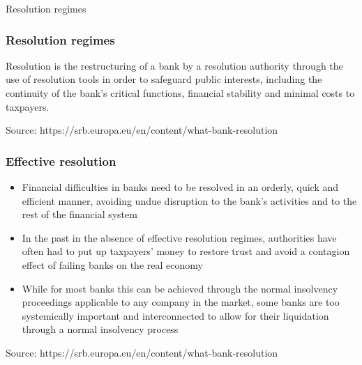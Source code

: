 \documentclass[11pt]{beamer}
\begin{document}




\begin{frame}
\begin{center}
Resolution regimes
\end{center}
\end{frame}


\begin{frame}
\frametitle{Resolution regimes}
\begin{center}
Resolution is the restructuring of a bank by a resolution authority through the use of resolution tools in order to safeguard public interests, including the continuity of the bank’s critical functions, financial stability and minimal costs to taxpayers.
\end{center}
\tiny{Source: https://srb.europa.eu/en/content/what-bank-resolution}
\end{frame}

\begin{frame}
\frametitle{Effective resolution}
\begin{itemize}
\item Financial difficulties in banks need to be resolved in an orderly, quick and efficient manner, avoiding undue disruption to the bank's activities and to the rest of the financial system
\item In the past in the absence of effective resolution regimes, authorities have often had to put up taxpayers' money to restore trust and avoid a contagion effect of failing banks on the real economy
\item  While for most banks this can be achieved through the normal insolvency proceedings applicable to any company in the market, some banks are too systemically important and interconnected to allow for their liquidation through a normal insolvency process

\end{itemize}
\tiny{Source: https://srb.europa.eu/en/content/what-bank-resolution}
\end{frame}
\end{document}
